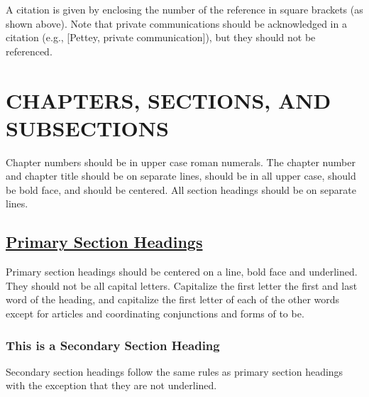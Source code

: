 \documentclass[12pt, oneside]{book}
\begin{document}
	A citation is given by enclosing the number of the reference in square brackets (as shown above).  Note that private communications should be acknowledged in a citation (e.g., [Pettey, private communication]), but they should not be referenced.
	
\chapter{\textbf{CHAPTERS, SECTIONS, AND SUBSECTIONS}}
Chapter numbers should be in upper case roman numerals.  The chapter number and chapter title should be on separate lines, should be in all upper case, should be bold face, and should be centered.  All section headings should be on separate lines.

\section{\underline{Primary Section Headings}}
Primary section headings should be centered on a line, bold face and underlined.  They should not be all capital letters.  Capitalize the first letter the first and last word of the heading, and capitalize the first letter of each of the other words except for articles and coordinating conjunctions and forms of to be.  

\subsection{This is a Secondary Section Heading}
Secondary section headings follow the same rules as primary section headings with the exception that they are not underlined.  


	

\clearpage
\markboth{}{}

\end{document}
